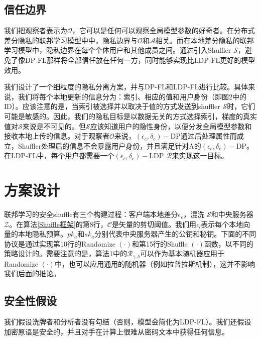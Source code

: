 \subsection{信任边界}
我们把观察者表示为$\mathcal{O}$，它可以是任何可以观察全局模型参数的好奇者。在分布式差分隐私的联邦学习模型中中，隐私边界与$\mathcal{O}$和$\mathcal{A}$相关。而在本地差分隐私的联邦学习模型中，隐私边界在每个个体用户和其他成员之间。通过引入Shuffler $\mathcal{S}$，避免了像DP-FL那样将全部信任放在任何一方，同时能够实现比LDP-FL更好的模型效用。

我们设计了一个细粒度的隐私分离方案，并与DP-FL和LDP-FL进行比较。具体来说，我们将每个本地更新的信息分为：索引、相应的值和用户身份（即图2中的ID）。应该注意的是，当索引被选择并以取决于值的方式发送到shuffler $\mathcal{S}$时，它们可能是敏感的。因此，我们的隐私目标是以数据无关的方式选择索引，梯度的真实值对$\mathcal{S}$来说是不可见的。但$\mathcal{S}$应该知道用户的隐性身份，以便分发全局模型参数和接收本地上传的信息。对于观察者$\mathcal{O}$来说，$\left(\epsilon_{c},\delta_{c}\right)-\mathrm{DP}$通过后处理属性而成立，Shuffler处理后的信息不会暴露用户身份，并且满足针对A的$\left(\epsilon_{c},\delta_{c}\right)-\mathrm{DP}$。在LDP-FL中，每个用户都需要一个$\left(\epsilon_{c},\delta_{c}\right)-\mathrm{LDP}$ $\mathcal{R}$来实现这一目标。

\section{方案设计}
联邦学习的安全shuffle有三个构建过程：客户端本地差分$\epsilon_{c}$，混洗 $\mathcal{S}$和中央服务器 $\mathcal{Z}$。在算法\ref{Shuffle框架}的第8行，$\mathcal{C}$是矢量的剪切阈值。我们用$\epsilon_{l}$表示每个本地向量的本地隐私预算。$p k_{a}$和$s k_{a}$分别代表中央服务器产生的公钥和秘钥。下面的不同协议是通过实现第10行的Randomize $(\cdot)$和第15行的Shuffle $(\cdot)$函数，以不同的策略设计的。需要注意的是，算法1中的$\mathcal{R}_{\gamma,b}$可以作为基本随机器应用于Randomize $(\cdot)$中，也可以应用通用的随机器（例如拉普拉斯机制），这并不影响我们后面的推论。

\subsection{安全性假设}
我们假设洗牌者和分析者没有勾结（否则，模型会简化为LDP-FL）。我们还假设加密原语是安全的，并且对手在计算上很难从密码文本中获得任何信息。

